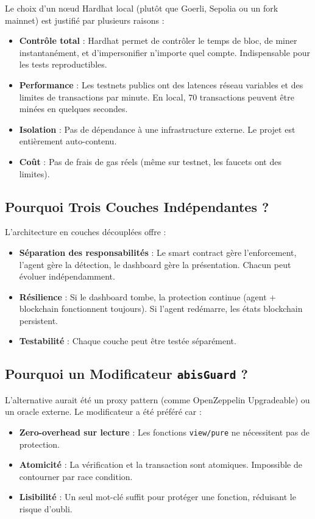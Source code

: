 \documentclass[12pt,a4paper]{report}
\newcommand{\code}[1]{\texttt{#1}}
\begin{document}
Le choix d'un nœud Hardhat local (plutôt que Goerli, Sepolia ou un fork mainnet) est justifié par plusieurs raisons :

\begin{itemize}
  \item \textbf{Contrôle total} : Hardhat permet de contrôler le temps de bloc, de miner instantanément, et d'impersonifier n'importe quel compte. Indispensable pour les tests reproductibles.
  \item \textbf{Performance} : Les testnets publics ont des latences réseau variables et des limites de transactions par minute. En local, 70 transactions peuvent être minées en quelques secondes.
  \item \textbf{Isolation} : Pas de dépendance à une infrastructure externe. Le projet est entièrement auto-contenu.
  \item \textbf{Coût} : Pas de frais de gas réels (même sur testnet, les faucets ont des limites).
\end{itemize}

\subsection{Pourquoi Trois Couches Indépendantes ?}

L'architecture en couches découplées offre :
\begin{itemize}
  \item \textbf{Séparation des responsabilités} : Le smart contract gère l'enforcement, l'agent gère la détection, le dashboard gère la présentation. Chacun peut évoluer indépendamment.
  \item \textbf{Résilience} : Si le dashboard tombe, la protection continue (agent + blockchain fonctionnent toujours). Si l'agent redémarre, les états blockchain persistent.
  \item \textbf{Testabilité} : Chaque couche peut être testée séparément.
\end{itemize}

\subsection{Pourquoi un Modificateur \code{abisGuard} ?}

L'alternative aurait été un proxy pattern (comme OpenZeppelin Upgradeable) ou un oracle externe. Le modificateur a été préféré car :
\begin{itemize}
  \item \textbf{Zero-overhead sur lecture} : Les fonctions \code{view/pure} ne nécessitent pas de protection.
  \item \textbf{Atomicité} : La vérification et la transaction sont atomiques. Impossible de contourner par race condition.
  \item \textbf{Lisibilité} : Un seul mot-clé suffit pour protéger une fonction, réduisant le risque d'oubli.
\end{itemize}
\end{document}
